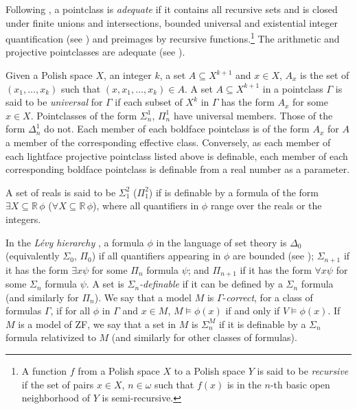 \documentclass{book}%
\begin{document}
Following \cite{Moschovakis:DST09}, a pointclass is
\emph{adequate}
if it contains all recursive sets
and is closed under finite unions and intersections, bounded
universal and existential integer quantification (see \cite[p.~119]{Moschovakis:DST09}) and preimages by
recursive functions.\footnote{A function
$f$ from a Polish space $X$ to a Polish space $Y$ is said to be
\emph{recursive} if the set of pairs
$x \in X$, $n \in \omega$ such that $f(x)$ is in the $n$-th basic open neighborhood of
$Y$ is semi-recursive.} The arithmetic and projective pointclasses are
adequate (see \cite[pp.~118-120]{Moschovakis:DST09}).


Given a Polish space $X$, an integer $k$, a set $A \subseteq X^{k+1}$ and $x \in X$,
$A_{x}$ is the set of $(x_{1},\ldots,x_{k})$ such
that $(x,x_{1},\ldots,x_{k}) \in A$. A set $A \subseteq X^{k+1}$ in
a pointclass $\Gamma$ is said to be \emph{universal}
for $\Gamma$ if each
subset of $X^{k}$ in $\Gamma$ has the form $A_{x}$ for some $x \in X$. Pointclasses of the form
$\Sigma^{1}_{n}$, $\Pi^{1}_{n}$ have universal members. Those of the form $\Delta^{1}_{n}$ do not. Each member of each
boldface pointclass is of the form $A_{x}$ for $A$ a member of the
corresponding effective class. Conversely, as each member of each
lightface projective pointclass listed above is definable, each member of each
corresponding boldface pointclass is definable from a real number as
a parameter.

A set of reals is said to be $\Sigma^{2}_{1}$ ($\Pi^{2}_{1}$) if is definable by a formula of the
form $\exists X \subseteq \mathbb{R}\, \phi$ ($\forall X \subseteq \mathbb{R}\, \phi$),
where all quantifiers in $\phi$ range over the reals or the integers.


In the \emph{L\'{e}vy hierarchy} \cite{Levy:1965},   a
formula $\phi$ in the language of set theory is $\Delta_{0}$ (equivalently $\Sigma_{0}$, $\Pi_{0}$) if
all quantifiers appearing in $\phi$ are bounded (see \cite[Chapter 13]{Jech:settheory}); $\Sigma_{n+1}$ if it has the
form $\exists x \psi$ for some $\Pi_{n}$ formula $\psi$; and $\Pi_{n+1}$ if it has the form $\forall x \psi$ for some $\Sigma_{n}$
formula $\psi$. A set is {\it $\Sigma_{n}$-definable} if it can be defined by a $\Sigma_{n}$ formula (and similarly for
$\Pi_{n}$). We say that a model $M$ is $\Gamma$-\emph{correct}, for a class of
formulas $\Gamma$, if for all $\phi$ in $\Gamma$ and $x \in M$, $M \models \phi(x)$ if and only if $V \models \phi(x)$.
If $M$ is a model of ZF, we say that a set in $M$ is $\Sigma^{M}_{n}$ if it is definable by a $\Sigma_{n}$
formula relativized to $M$ (and similarly for other classes of formulas).
\end{document}
